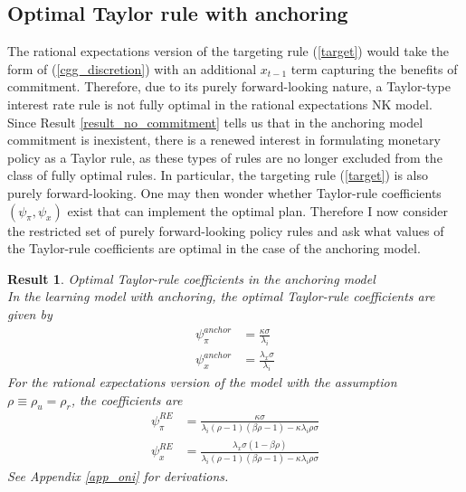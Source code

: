 \documentclass[11pt]{article}
\renewcommand{\[}{\begin{equation}}
\renewcommand{\]}{\end{equation}}
\newtheorem{result}{Result}
\begin{document}
\subsection{Optimal Taylor rule with anchoring}\label{opt_TR}
The rational expectations version of the targeting rule (\ref{target}) would take the form of (\ref{cgg_discretion}) with an additional $x_{t-1}$ term capturing the benefits of commitment. Therefore, due to its purely forward-looking nature, a Taylor-type interest rate rule is not fully optimal in the rational expectations NK model. Since Result \ref{result_no_commitment} tells us that in the anchoring model commitment is inexistent, there is a renewed interest in formulating monetary policy as a Taylor rule, as these types of rules are no longer excluded from the class of fully optimal rules. In particular, the targeting rule (\ref{target}) is also purely forward-looking. One may then wonder whether Taylor-rule coefficients $(\psi_{\pi}, \psi_x)$ exist that can implement the optimal plan. Therefore I now consider the restricted set of purely forward-looking policy rules and ask what values of the Taylor-rule coefficients are optimal in the case of the anchoring model.

\begin{result} Optimal Taylor-rule coefficients in the anchoring model \\
In the learning model with anchoring, the optimal Taylor-rule coefficients are given by
\begin{align}
\psi_{\pi}^{anchor} & = \frac{\kappa  \sigma }{\lambda_i} \label{opt_psipi_anchor}
\\
\psi_{x}^{anchor} & =  \frac{\lambda_x\sigma }{\lambda_i } \label{opt_psix_anchor}
\end{align}
For the rational expectations version of the model with the assumption $\rho \equiv \rho_u = \rho_r$, the coefficients are
\begin{align}
\psi_{\pi}^{RE} & = \frac{\kappa  \sigma }{\lambda_i(\rho -1) (\beta  \rho -1)-\kappa  \lambda_i \rho  \sigma } \label{opt_psipi_RE}
\\
\psi_{x}^{RE} & =  \frac{\lambda_x\sigma  (1-\beta  \rho )}{\lambda_i (\rho -1) (\beta  \rho -1)-\kappa  \lambda_i \rho  \sigma } \label{opt_psix_RE}
\end{align}
See Appendix \ref{app_oni} for derivations.
\label{result_TR}
\end{result}
\end{document}

